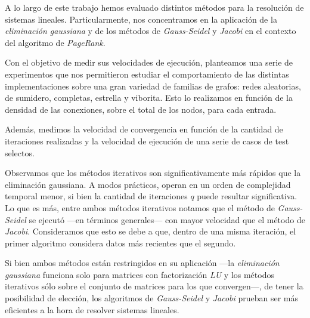 A lo largo de este trabajo hemos evaluado distintos métodos para la resolución de sistemas lineales. Particularmente, nos concentramos en la aplicación de la \textit{eliminación gaussiana} y de los métodos de \textit{Gauss-Seidel} y \textit{Jacobi} en el contexto del algoritmo de \textit{PageRank}. 

Con el objetivo de medir sus velocidades de ejecución, planteamos una serie de experimentos que nos permitieron estudiar el comportamiento de las distintas implementaciones sobre una gran variedad de familias de grafos: redes aleatorias, de sumidero, completas, estrella y viborita. Esto lo realizamos en función de la densidad de las conexiones, sobre el total de los nodos, para cada entrada.

Además, medimos la velocidad de convergencia en función de la cantidad de iteraciones realizadas y la velocidad de ejecución de una serie de casos de test selectos.

\vspace{1em}
Observamos que los métodos iterativos son significativamente más rápidos que la eliminación gaussiana. A modos prácticos, operan en un orden de complejidad temporal menor, si bien la cantidad de iteraciones $q$ puede resultar significativa. Lo que es más, entre ambos métodos iterativos notamos que el método de \textit{Gauss-Seidel} se ejecutó ---en términos generales--- con mayor velocidad que el método de \textit{Jacobi}. Consideramos que esto se debe a que, dentro de una misma iteración, el primer algoritmo considera datos más recientes que el segundo.

\vspace{1em}
Si bien ambos métodos están restringidos en su aplicación ---la \textit{eliminación gaussiana} funciona solo para matrices con factorización \textit{LU} y los métodos iterativos sólo sobre el conjunto de matrices para los que convergen---, de tener la posibilidad de elección, los algoritmos de \textit{Gauss-Seidel} y \textit{Jacobi} prueban ser más eficientes a la hora de resolver sistemas lineales.